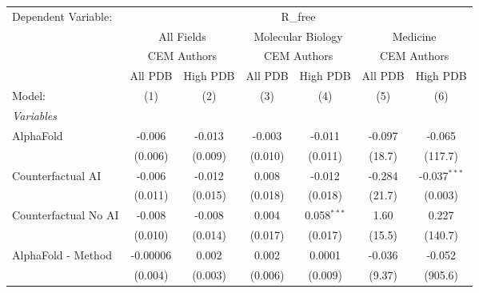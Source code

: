\begingroup
\centering
\begin{tabular}{lcccccc}
   \tabularnewline \midrule \midrule
   Dependent Variable: & \multicolumn{6}{c}{R\_free}\\
 & \multicolumn{2}{c}{All Fields} & \multicolumn{2}{c}{Molecular Biology} & \multicolumn{2}{c}{Medicine} \\
\cmidrule(lr){2-3} \cmidrule(lr){4-5} \cmidrule(lr){6-7}
 & \multicolumn{2}{c}{CEM Authors} & \multicolumn{2}{c}{CEM Authors} & \multicolumn{2}{c}{CEM Authors} \\
\cmidrule(lr){2-3} \cmidrule(lr){4-5} \cmidrule(lr){6-7}
 & \multicolumn{1}{c}{All PDB} & \multicolumn{1}{c}{High PDB} & \multicolumn{1}{c}{All PDB} & \multicolumn{1}{c}{High PDB} & \multicolumn{1}{c}{All PDB} & \multicolumn{1}{c}{High PDB} \\
\cmidrule(lr){2-2} \cmidrule(lr){3-3} \cmidrule(lr){4-4} \cmidrule(lr){5-5} \cmidrule(lr){6-6} \cmidrule(lr){7-7}
   Model:                                                     & (1)            & (2)           & (3)     & (4)            & (5)            & (6)\\  
   \midrule
   \emph{Variables}\\
   AlphaFold                                                  & -0.006         & -0.013        & -0.003  & -0.011         & -0.097         & -0.065\\   
                                                              & (0.006)        & (0.009)       & (0.010) & (0.011)        & (18.7)         & (117.7)\\   
   Counterfactual AI                                          & -0.006         & -0.012        & 0.008   & -0.012         & -0.284         & -0.037$^{***}$\\   
                                                              & (0.011)        & (0.015)       & (0.018) & (0.018)        & (21.7)         & (0.003)\\   
   Counterfactual No AI                                       & -0.008         & -0.008        & 0.004   & 0.058$^{***}$  & 1.60           & 0.227\\   
                                                              & (0.010)        & (0.014)       & (0.017) & (0.017)        & (15.5)         & (140.7)\\   
   AlphaFold - Method                                         & -0.00006       & 0.002         & 0.002   & 0.0001         & -0.036         & -0.052\\   
                                                              & (0.004)        & (0.003)       & (0.006) & (0.009)        & (9.37)         & (905.6)\\   

\end{tabular}
